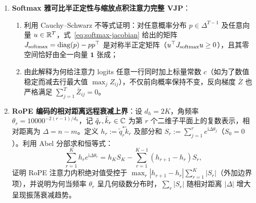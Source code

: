 \begin{enumerate}
  \item[\textbf{5.4.3}] \textbf{Softmax 雅可比半正定性与缩放点积注意力完整 VJP}：
  \begin{enumerate}
    \item 利用 Cauchy--Schwarz 不等式证明：对任意概率分布 $p \in \Delta^{T-1}$ 及任意向量 $u \in \mathbb{R}^T$，式~\eqref{eq:softmax-jacobian} 给出的矩阵 $J_{\operatorname{softmax}} = \operatorname{diag}(p) - p p^\top$ 是对称半正定矩阵（$u^\top J_{\operatorname{softmax}} u \ge 0$），且其零空间恰好由全一向量 $\mathbf{1}$ 张成；
    \item 由此解释为何给注意力 logits 任意一行同时加上标量常数 $c$（如为了数值稳定而减去行最大值 $\max_j Z_{ij}$），不仅前向概率保持不变，反向梯度 $\bar{Z}$ 也严格满足 $\sum_{j=1}^T \bar{Z}_{ij} = 0$。
  \end{enumerate}

  \item[\textbf{5.4.4}] \textbf{RoPE 编码的相对距离远程衰减上界}：设 $d_h = 2K$，角频率 $\theta_r = 10000^{-2(r-1)/d_h}$，记 $\tilde{q}_r, \tilde{k}_r \in \mathbb{C}$ 为第 $r$ 个二维子平面上的复数表示，相对距离为 $\Delta = n - m$。定义 $h_r := \tilde{q}_r^* \tilde{k}_r$ 及部分和 $S_r := \sum_{j=1}^r e^{\mathrm{i} \Delta \theta_j}$（$S_0 = 0$）。利用 Abel 分部求和恒等式：
  \[
    \sum_{r=1}^{K} h_r e^{\mathrm{i} \Delta \theta_r}
    = h_K S_K - \sum_{r=1}^{K-1} (h_{r+1} - h_r) S_r,
  \]
  证明 RoPE 注意力内积绝对值受控于 $\max_r |h_{r+1} - h_r| \sum_{r=1}^{K} |S_r|$（外加边界项），并说明为何当频率 $\theta_r$ 呈几何级数分布时，$\sum_r |S_r|$ 随相对距离 $|\Delta|$ 增大呈现振荡衰减趋势。
\end{enumerate}


